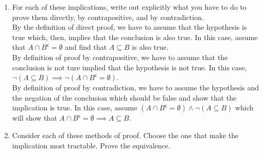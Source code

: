 \documentclass{article}
\begin{document}
\begin{enumerate}
\begin{flushleft}
			\begin{enumerate}
				\item For each of these implications, write out explicitly what you have to do to prove them directly, by contrapositive, and by contradiction. 
				\\ \vspace{1.5mm} 
				By the definition of direct proof, we have to assume that the hypothesis is true which, then, implies that the conclusion is also true. In this case, assume that $A \cap B^\mathsf{c} = \emptyset $ and find that $A \subseteq B $ is also true.
				\\ \vspace{1.5mm} 
				By definition of proof by contrapositive, we have to assume that the conclusion is not ture implied that the hypothesis is not true. In this case, $\neg (A \subseteq B) \implies \neg (A \cap B^\mathsf{c} = \emptyset)$. 
				\\ \vspace{1.5mm} 
				By definition of proof by contradiction, we have to assume the hypothesis and the negation of the conclusion which should be false and show that the implication is true. In this case, assume $(A \cap B^\mathsf{c} = \emptyset) \land \neg (A \subseteq B)$ which will show that $A \cap B^\mathsf{c} = \emptyset \implies A \subseteq B.$
				
				\item Consider each of these methods of proof. Choose the one that make the implication most tractable. Prove the equivalence.
				

\end{enumerate}
\end{flushleft}
\end{enumerate}
\end{document}
